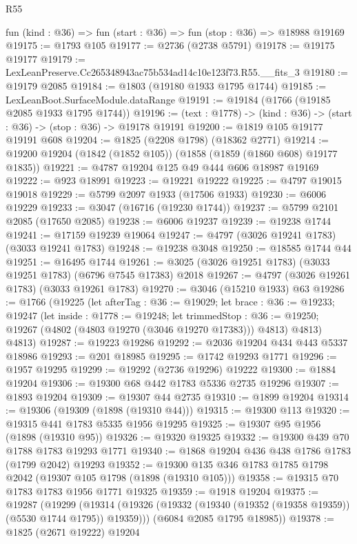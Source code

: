 \begin{lexlean}{R55}
\begin{coremodule}
  fun (kind : @36) => fun (start : @36) => fun (stop : @36) => @18988 @19169
@19175 := @1793 @105
@19177 := @2736 (@2738 @5791)
@19178 := @19175 @19177
@19179 := LexLeanPreserve.Cc265348943ac75b534ad14c10e123f73.R55.__fits_3
@19180 := @19179 @2085
@19184 := @1803 (@19180 @1933 @1795 @1744)
@19185 := LexLeanBoot.SurfaceModule.dataRange
@19191 := @19184 (@1766 (@19185 @2085 @1933 @1795 @1744))
@19196 := (text : @1778) -> (kind : @36) -> (start : @36) -> (stop : @36) -> @19178 @19191
@19200 := @1819 @105 @19177 @19191 @608
@19204 := @1825 (@2208 @1798) (@18362 @2771)
@19214 := @19200 @19204 (@1842 (@1852 @105)) (@1858 (@1859 (@1860 @608) @19177 @1835))
@19221 := @4787 @19204 @125 @49 @444 @606 @18987 @19169
@19222 := @923 @18991
@19223 := @19221 @19222
@19225 := @4797 @19015 @19018
@19229 := @5799 @2097 @1933 (@17506 @1933)
@19230 := @6006 @19229
@19233 := @3047 (@16716 (@19230 @1744))
@19237 := @5799 @2101 @2085 (@17650 @2085)
@19238 := @6006 @19237
@19239 := @19238 @1744
@19241 := @17159 @19239 @19064
@19247 := @4797 (@3026 @19241 @1783) (@3033 @19241 @1783)
@19248 := @19238 @3048
@19250 := @18585 @1744 @44
@19251 := @16495 @1744
@19261 := @3025 (@3026 @19251 @1783) (@3033 @19251 @1783) (@6796 @7545 @17383) @2018
@19267 := @4797 (@3026 @19261 @1783) (@3033 @19261 @1783)
@19270 := @3046 (@15210 @1933) @63
@19286 := @1766
    (@19225
      (let afterTag : @36 := @19029;
      let brace : @36 := @19233;
      @19247
        (let inside : @1778 := @19248;
        let trimmedStop : @36 := @19250; @19267 (@4802 (@4803 @19270 (@3046 @19270 @17383))) @4813)
        @4813)
      @4813)
@19287 := @19223 @19286
@19292 := @2036 @19204 @434 @443 @5337 @18986
@19293 := @201 @18985
@19295 := @1742 @19293 @1771
@19296 := @1957 @19295
@19299 := @19292 (@2736 @19296) @19222
@19300 := @1884 @19204
@19306 := @19300 @68 @442 @1783 @5336 @2735 @19296
@19307 := @1893 @19204
@19309 := @19307 @44 @2735
@19310 := @1899 @19204
@19314 := @19306 (@19309 (@1898 (@19310 @44)))
@19315 := @19300 @113
@19320 := @19315 @441 @1783 @5335 @1956 @19295
@19325 := @19307 @95 @1956 (@1898 (@19310 @95))
@19326 := @19320 @19325
@19332 := @19300 @439 @70 @1788 @1783 @19293 @1771
@19340 := @1868 @19204 @436 @438 @1786 @1783 (@1799 @2042) @19293
@19352 := @19300 @135 @346 @1783 @1785 @1798 @2042 (@19307 @105 @1798 (@1898 (@19310 @105)))
@19358 := @19315 @70 @1783 @1783 @1956 @1771 @19325
@19359 := @1918 @19204
@19375 := @19287
    (@19299
      (@19314 (@19326 (@19332 (@19340 (@19352 (@19358 @19359)) (@5530 @1744 @1795)) @19359)))
      (@6084 @2085 @1795 @18985))
@19378 := @1825 (@2671 @19222) @19204

\end{coremodule}
\end{lexlean}
